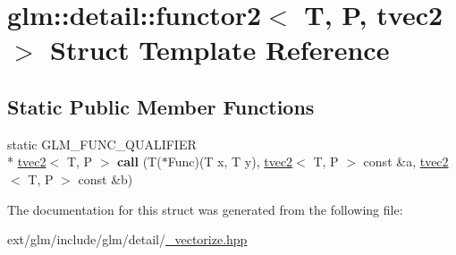 \hypertarget{structglm_1_1detail_1_1functor2_3_01_t_00_01_p_00_01tvec2_01_4}{\section{glm\-:\-:detail\-:\-:functor2$<$ T, P, tvec2 $>$ Struct Template Reference}
\label{structglm_1_1detail_1_1functor2_3_01_t_00_01_p_00_01tvec2_01_4}
}
\subsection*{Static Public Member Functions}
\begin{DoxyCompactItemize}
\item 
\hypertarget{structglm_1_1detail_1_1functor2_3_01_t_00_01_p_00_01tvec2_01_4_a3f747eea2648beb35126086723c1797f}{static G\-L\-M\-\_\-\-F\-U\-N\-C\-\_\-\-Q\-U\-A\-L\-I\-F\-I\-E\-R \\*
\hyperlink{structglm_1_1tvec2}{tvec2}$<$ T, P $>$ {\bfseries call} (T($\ast$Func)(T x, T y), \hyperlink{structglm_1_1tvec2}{tvec2}$<$ T, P $>$ const \&a, \hyperlink{structglm_1_1tvec2}{tvec2}$<$ T, P $>$ const \&b)}\label{structglm_1_1detail_1_1functor2_3_01_t_00_01_p_00_01tvec2_01_4_a3f747eea2648beb35126086723c1797f}

\end{DoxyCompactItemize}


The documentation for this struct was generated from the following file\-:\begin{DoxyCompactItemize}
\item 
ext/glm/include/glm/detail/\hyperlink{__vectorize_8hpp}{\-\_\-vectorize.\-hpp}\end{DoxyCompactItemize}
